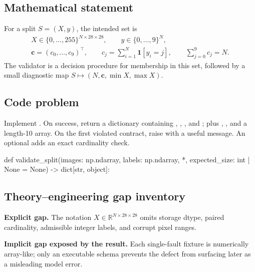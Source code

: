 
        \subsection{Mathematical statement}


For a split $S=(X,y)$, the intended set is
\[
\begin{gathered}
X\in\{0,\ldots,255\}^{N\times 28\times 28},\qquad
y\in\{0,\ldots,9\}^{N},\\
\bm c=(c_0,\ldots,c_9)^\top,\qquad
c_j=\sum_{i=1}^{N}\mathbf 1[y_i=j],\qquad
\sum_{j=0}^{9}c_j=N.
\end{gathered}
\]
The validator is a decision procedure for membership in this set, followed by a
small diagnostic map $S\mapsto(N,\bm c,\min X,\max X)$.


        \subsection{Code problem}


Implement .\newline
On success, return a dictionary containing , ,
, and ; plus ,
, and a length-10  array.
On the first violated contract, raise  with a useful
message.  An optional  adds an exact cardinality check.


        \begin{contractbox}
        \begin{Code}
        def validate_split(images: np.ndarray, labels: np.ndarray, *, expected_size: int | None = None) -> dict[str, object]:
        \end{Code}
        \end{contractbox}

        \subsection{Theory--engineering gap inventory}

        \begin{gapbox}
        \textbf{Explicit gap.} The notation $X\in\mathbb{R}^{N\times 28\times28}$ omits storage dtype, paired cardinality, admissible integer labels, and corrupt pixel ranges.

        \textbf{Implicit gap exposed by the result.} Each single-fault fixture is numerically array-like; only an executable schema prevents the defect from surfacing later as a misleading model error.
        \end{gapbox}

